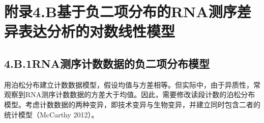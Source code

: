 \section*{附录4.B\quad 基于负二项分布的RNA测序差异表达分析的对数线性模型}

\subsection*{4.B.1\quad RNA测序计数数据的负二项分布模型}

用泊松分布建立计数数据模型，假设均值与方差相等。但实际中，由于异质性，常观察到RNA测序计数数据的方差大于均值。因此，需要修改读段计数的泊松分布模型。考虑计数数据的两种变异，即技术变异与生物变异，并建立同时包含二者的统计模型（McCarthy 2012）。


